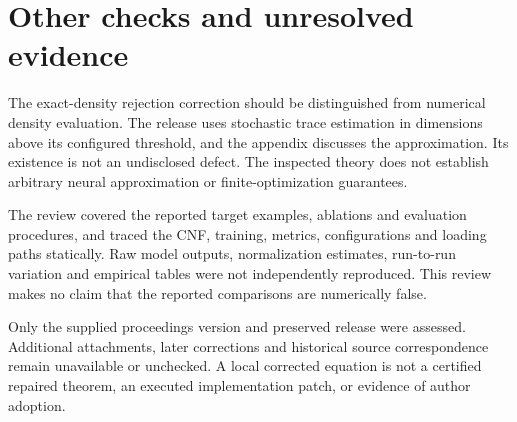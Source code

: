 \documentclass[10pt]{article}
\begin{document}
\section*{Other checks and unresolved evidence}
The exact-density rejection correction should be distinguished from numerical density evaluation. The release uses stochastic trace estimation in dimensions above its configured threshold, and the appendix discusses the approximation. Its existence is not an undisclosed defect. The inspected theory does not establish arbitrary neural approximation or finite-optimization guarantees.\par
The review covered the reported target examples, ablations and evaluation procedures, and traced the CNF, training, metrics, configurations and loading paths statically. Raw model outputs, normalization estimates, run-to-run variation and empirical tables were not independently reproduced. This review makes no claim that the reported comparisons are numerically false.\par
Only the supplied proceedings version and preserved release were assessed. Additional attachments, later corrections and historical source correspondence remain unavailable or unchecked. A local corrected equation is not a certified repaired theorem, an executed implementation patch, or evidence of author adoption.\par
\end{document}
